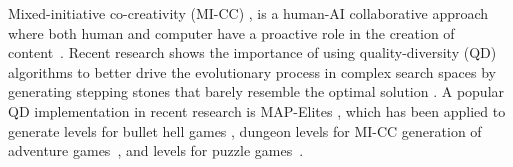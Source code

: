 Mixed-initiative co-creativity (MI-CC) \cite{p9yannakakis2014micc}, is a human-AI collaborative approach where both human and computer have a proactive role in the creation of content~\cite{p9liapis_generating_2013}. %
Recent research shows the importance of using quality-diversity (QD) algorithms \cite{p9Pugh2016,gravina2019procedural} to better drive the evolutionary process in complex search spaces by generating stepping stones that barely resemble the optimal solution \cite{p9gaier2019quality}. A popular QD implementation in recent research is MAP-Elites \cite{p9Mouret2015}, which has been applied to generate levels for bullet hell games \cite{p9Khalifa2018}, dungeon levels for MI-CC generation of adventure games~\cite{p9alvarez2019empowering}, and levels for puzzle games~\cite{p9charity2020baba}.%


